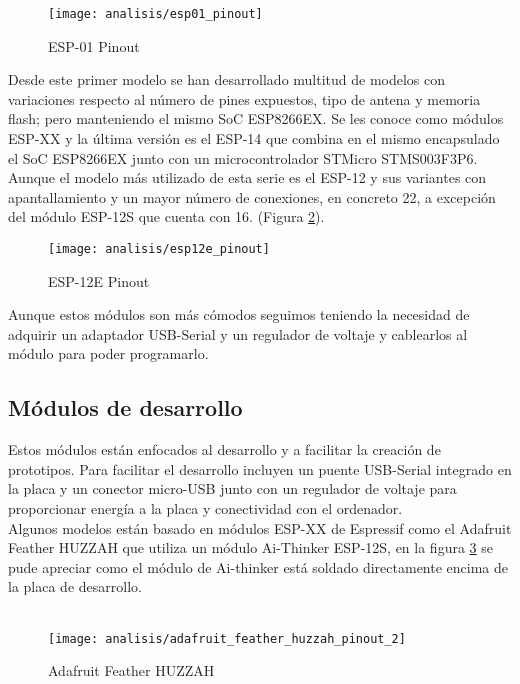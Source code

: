 \documentclass[../proyecto.tex]{subfiles}
\begin{document}
\begin{figure}[h]
\centering
\texttt{[image: analisis/esp01\_pinout]}
\caption{ESP-01 Pinout}
\label{fig:esp01_pinout}
\end{figure}

Desde este primer modelo se han desarrollado multitud de modelos con variaciones respecto al número de pines expuestos, tipo de antena y memoria flash; pero manteniendo el mismo SoC ESP8266EX. Se les conoce como módulos ESP-XX y la última versión es el ESP-14 que combina en el mismo encapsulado el SoC ESP8266EX junto con un microcontrolador STMicro STMS003F3P6. Aunque el modelo más utilizado de esta serie es el ESP-12 y sus variantes con apantallamiento y un mayor número de conexiones, en concreto 22, a excepción del módulo ESP-12S que cuenta con 16. (Figura \ref{fig:esp12e_pinout}).\\

\begin{figure}[H]
\centering
\texttt{[image: analisis/esp12e\_pinout]}
\caption{ESP-12E Pinout}
\label{fig:esp12e_pinout}
\end{figure}

Aunque estos módulos son más cómodos seguimos teniendo la necesidad de adquirir un adaptador USB-Serial y un regulador de voltaje y cablearlos al módulo para poder programarlo.\\

\subsection{Módulos de desarrollo}

Estos módulos están enfocados al desarrollo y a facilitar la creación de prototipos. Para facilitar el desarrollo incluyen un puente USB-Serial integrado en la placa y un conector micro-USB junto con un regulador de voltaje para proporcionar energía a la placa y conectividad con el ordenador.\\

Algunos modelos están basado en módulos ESP-XX de Espressif como el Adafruit Feather HUZZAH \cite{adafruit_feather_huzzah} que utiliza un módulo Ai-Thinker ESP-12S, en la figura \ref{fig:adafruit_feather_huzzah_pinout_2} se pude apreciar como el módulo de Ai-thinker está soldado directamente encima de la placa de desarrollo.\\~\\

\begin{figure}[H]
\centering
\texttt{[image: analisis/adafruit\_feather\_huzzah\_pinout\_2]}
\caption{Adafruit Feather HUZZAH}
\label{fig:adafruit_feather_huzzah_pinout_2}
\end{figure}
\end{document}
